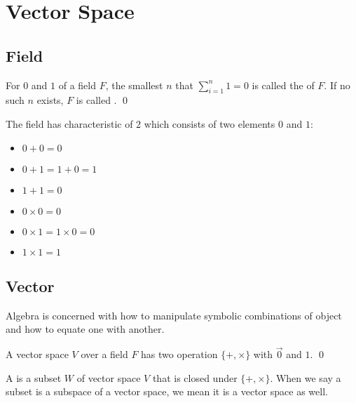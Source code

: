 \section{Vector Space}

\subsection{Field}

\begin{definition}
    For $0$ and $1$ of a field $F$, the smallest $n$ that $\displaystyle \sum_{i=1}^n 1 = 0$ is called the  of $F$. If no such $n$ exists, $F$ is called .
    \qed
\end{definition}

\begin{definition}
    The field  has characteristic of $2$ which consists of two elements $0$ and $1$:
    \begin{itemize}
        \item $0 + 0 = 0$
        \item $0 + 1 = 1 + 0 = 1$
        \item $1 + 1 = 0$
        \item $0 \times 0 = 0$
        \item $0 \times 1 = 1 \times 0 = 0$
        \item $1 \times 1 = 1$
    \end{itemize}
\end{definition}

\subsection{Vector}

Algebra is concerned with how to manipulate symbolic combinations of object and how to equate one with another.

\begin{definition}
A  vector space $V$ over a  field $F$ has two operation $\{+,\times\}$ with $\vec{0}$ and $1$. \qed
\end{definition}



\begin{definition}
	A  is a subset $W$ of vector space $V$ that is closed under $\{+,\times\}$. When we say a subset is a subspace of a vector space, we mean it is a vector space as well.
\end{definition}

